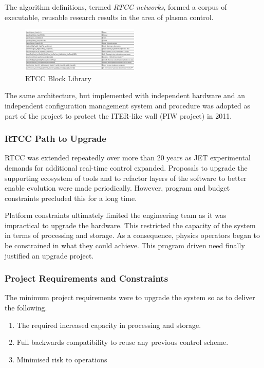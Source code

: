 \documentclass[5p]{elsarticle}
\begin{document}
The algorithm definitions, termed {\em RTCC networks}, formed a corpus
of executable, reusable research results in the area of plasma control.

\begin{figure}[ht!]%
\centering
\includegraphics[width=0.5\textwidth]{L1RTCC.PNG}
\caption{RTCC Block Library}\label{fig3}
\end{figure}

The same architecture, but implemented with independent hardware
and an independent configuration management system and procedure 
was adopted as part of the project to protect the ITER-like wall
(PIW project) in 2011.

\subsubsection{RTCC Path to Upgrade}

RTCC was extended repeatedly over more than 20 years as JET
experimental demands for additional real-time control expanded.
Proposals to upgrade the supporting ecosystem of tools
and to refactor layers of the software to better enable
evolution were made periodically.  However, program and budget
constraints precluded this for a long time.

Platform constraints ultimately limited the engineering
team as it was impractical to upgrade the hardware.
This restricted the capacity of the system in terms of
processing and storage.  As a consequence, physics operators
began to be constrained in what they could achieve.
This program driven need finally justified an upgrade
project.

\subsubsection{Project Requirements and Constraints}

The minimum project requirements were to 
upgrade the system so as to deliver the following.

\begin{enumerate}
	\item{The required increased capacity in processing and storage.}
	\item{Full backwards compatibility to reuse any previous control scheme.}
	\item{Minimised risk to operations}
\end{enumerate}
\end{document}
